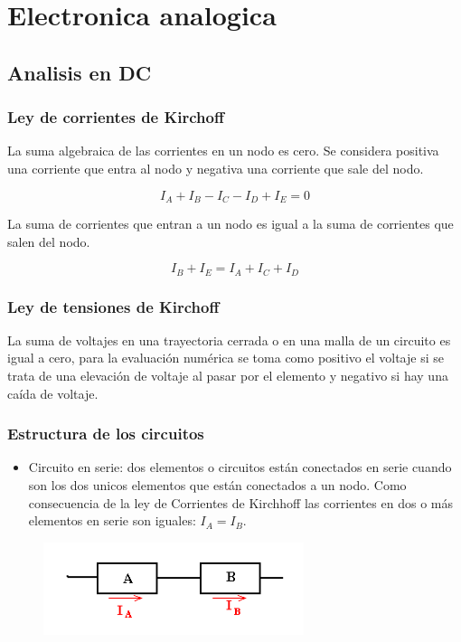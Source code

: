 \documentclass{beamer}
\begin{document}
\section{Electronica analogica}

\subsection{Analisis en DC}

\begin{frame}
\frametitle{Ley de corrientes de Kirchoff}

La suma algebraica de las corrientes en un nodo es cero. Se considera positiva una corriente que entra al nodo y negativa una corriente que sale del nodo.

$$I_{A} + I_{B} - I_{C} - I_{D} + I_{E} = 0$$

La suma de corrientes que entran a un nodo es igual a la suma de corrientes que salen del nodo.

$$I_{B} + I_{E} = I_{A} + I_{C} + I_{D}$$

\end{frame}

\begin{frame}
\frametitle{Ley de tensiones de Kirchoff}

La suma de voltajes en una trayectoria cerrada o en una malla de un circuito es igual a cero, para la evaluación numérica se toma como positivo el voltaje si se trata de una elevación de voltaje al pasar por el elemento y negativo si hay una caída de voltaje.

\end{frame}



\begin{frame}
\frametitle{Estructura de los circuitos}

\begin{itemize}
\item Circuito en serie: dos elementos o circuitos están conectados en serie cuando son los dos unicos elementos que están conectados a un nodo. Como consecuencia de la ley de Corrientes de Kirchhoff las corrientes en dos o más elementos en serie son iguales: $I_{A} = I_{B}$.
\end{itemize}

\begin{figure}[!h]
\centering
\includegraphics[width=3in]{serie}
\end{figure}

\end{frame}
\end{document}
